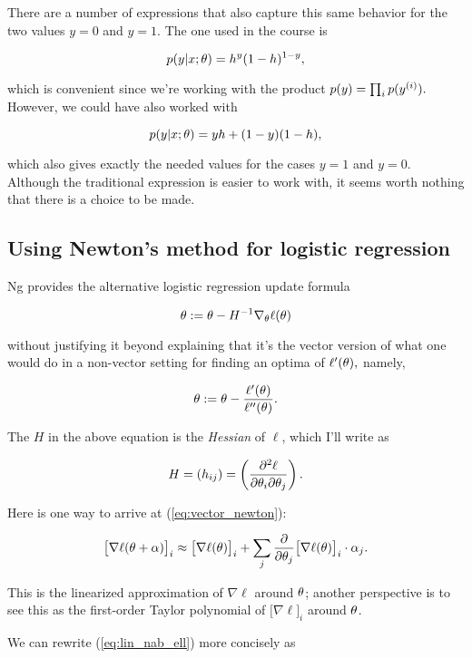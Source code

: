 \documentclass[]{article}
\begin{document}
There are a number of expressions that also capture this same behavior
for the two values \(y=0\) and \(y=1.\) The one used in the course is

\[p(y|x;\theta) = h^y(1-h)^{1-y},\]

which is convenient since we're working with the product
\(p(y) = \prod_i p(y^{(i)}).\) However, we could have also worked with

\[p(y|x;\theta) = yh + (1-y)(1-h),\]

which also gives exactly the needed values for the cases \(y=1\) and
\(y=0.\) Although the traditional expression is easier to work with, it
seems worth nothing that there is a choice to be made.

\subsection{Using Newton's method for logistic
regression}\label{using-newtons-method-for-logistic-regression}

Ng provides the alternative logistic regression update formula

\begin{equation}\theta := \theta - H^{-1}\nabla_\theta\ell(\theta)\label{eq:vector_newton}\end{equation}

without justifying it beyond explaining that it's the vector version of
what one would do in a non-vector setting for finding an optima of
\(\ell'(\theta),\) namely,

\[\theta := \theta - \frac{\ell'(\theta)}{\ell''(\theta)}.\]

The \(H\) in the above equation is the \emph{Hessian} of \(\ell\), which
I'll write as

\[H = (h_{ij}) =
\left(\frac{\partial^2\ell}{\partial\theta_i\partial\theta_j}\right).\]

Here is one way to arrive at (\ref{eq:vector_newton}):

\begin{equation}\big[\nabla\ell(\theta+\alpha)\big]_i
  \approx \big[\nabla\ell(\theta)\big]_i
  + \sum_j\frac{\partial}{\partial\theta_j}\big[\nabla\ell(\theta)\big]_i
  \cdot\alpha_j.\label{eq:lin_nab_ell}\end{equation}

This is the linearized approximation of \(\nabla\ell\) around \(\theta\);
another perspective is to see this as the first-order Taylor polynomial
of \(\big[\nabla\ell\big]_i\) around \(\theta\).

We can rewrite (\ref{eq:lin_nab_ell}) more concisely as
\end{document}
